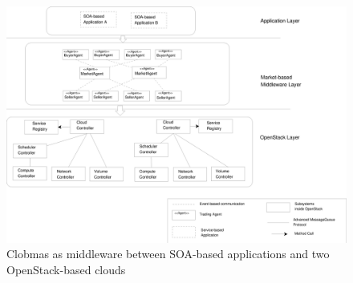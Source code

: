 \documentclass[10pt,journal,compsoc]{IEEEtran}
\begin{document}
\begin{figure}[htbp]
    \centering
    \includegraphics[scale=0.32]{Figure3.eps}
    \caption{Clobmas as middleware between SOA-based applications and two OpenStack-based clouds \label{fig:architectural_context}}
\end{figure}

%
\end{document}
